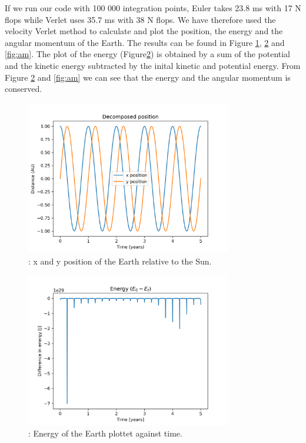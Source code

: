 \documentclass{article}
\begin{document}
    If we run our code with 100 000 integration points, Euler takes 23.8 ms with 17 N flops while Verlet uses 35.7 ms with 38 N flops. We have therefore used the velocity Verlet method to calculate and plot the position, the energy and the angular momentum of the Earth. The results can be found in Figure \ref{fig:position}, \ref{fig:energy} and \ref{fig:am}. The plot of the energy (Figure\ref{fig:energy}) is obtained by a sum of the potential and the kinetic energy subtracted by the inital kinetic and potential energy. From Figure \ref{fig:energy} and \ref{fig:am} we can see that the energy and the angular momentum is conserved.

    \begin{figure}[H]
        \begin{center}
            \includegraphics[width=0.8\textwidth]{./Plot/xy_vs_time.png}
            \caption{: x and y position of the Earth relative to the Sun.}
            \label{fig:position}
        \end{center}
    \end{figure}

    \begin{figure}[H]
        \begin{center}
            \includegraphics[width=0.8\textwidth]{./Plot/energy.png}
            \caption{: Energy of the Earth plottet against time.
            }
            \label{fig:energy}
        \end{center}
    \end{figure}
\end{document}
